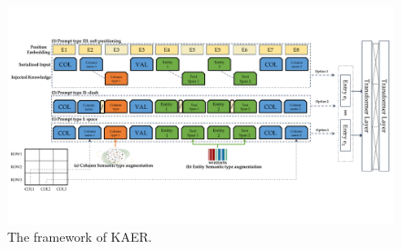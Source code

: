 \begin{figure}[!ht]
    \centering
    \includegraphics[width=\linewidth]{plots/DCER_short.pdf}
    \caption{The framework of KAER.}
    \vspace{-0.5cm}
    \label{fig:framework}
\end{figure}





